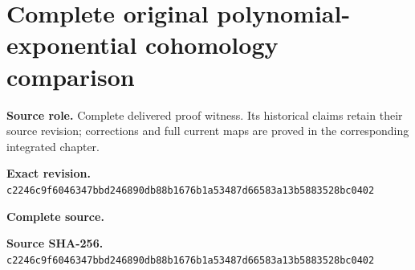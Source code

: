 \begingroup
\sloppy
\small
\clearpage
\section{Complete original polynomial-exponential cohomology comparison}
\noindent\textbf{Source role.} Complete delivered proof witness. Its historical claims retain their source revision; corrections and full current maps are proved in the corresponding integrated chapter.\par
\noindent\textbf{Exact revision.} \nolinkurl{c2246c9f6046347bbd246890db88b1676b1a53487d66583a13b5883528bc0402}\par
\noindent\textbf{Complete source.} \par
\noindent\textbf{Source SHA-256.} \nolinkurl{c2246c9f6046347bbd246890db88b1676b1a53487d66583a13b5883528bc0402}\par\medskip

\endgroup
